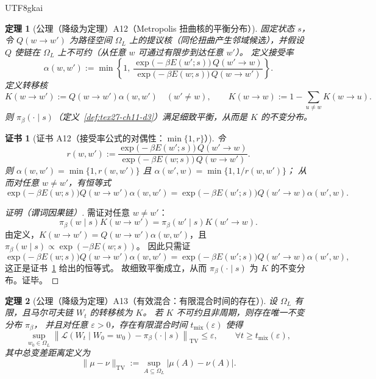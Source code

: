 \documentclass[12pt]{article}
\newtheorem{theorem}{定理}[section]
\newtheorem{Certificate}{证书}[section]
\begin{document}
\begin{CJK*}{UTF8}{gkai}
\begin{theorem}[公理（降级为定理）A12（Metropolis 扭曲核的平衡分布）]
\label{thm:tex27-ch11-a12}
固定状态 $s$，令 $Q(w\to w')$ 为路径空间 $\Omega_L$ 上的提议核（同伦扭曲产生邻域候选），并假设 $Q$ 使链在 $\Omega_L$ 上不可约（从任意 $w$ 可通过有限步到达任意 $w'$）。
定义接受率
\[
  \alpha(w,w')
  :=\min\left\{
  1,\
  \frac{\exp\bigl(-\beta E(w';s)\bigr)\,Q(w'\to w)}{\exp\bigl(-\beta E(w;s)\bigr)\,Q(w\to w')}
  \right\}.
\]
定义转移核
\[
  K(w\to w')
  :=Q(w\to w')\alpha(w,w')\quad (w'\ne w),
  \qquad
  K(w\to w):=1-\sum_{u\ne w}K(w\to u).
\]
则 $\pi_\beta(\cdot\mid s)$（定义~\ref{def:tex27-ch11-d3}）满足细致平衡，从而是 $K$ 的不变分布。
\end{theorem}

\begin{Certificate}[证书 A12（接受率公式的对偶性：$\min\{1,r\}$）]
\label{cert:tex27-ch11-a12}
令
\[
  r(w,w')
  :=\frac{\exp\bigl(-\beta E(w';s)\bigr)\,Q(w'\to w)}{\exp\bigl(-\beta E(w;s)\bigr)\,Q(w\to w')}.
\]
则 $\alpha(w,w')=\min\{1,r(w,w')\}$ 且 $\alpha(w',w)=\min\{1,1/r(w,w')\}$；
从而对任意 $w\ne w'$，有恒等式
\[
  \exp\bigl(-\beta E(w;s)\bigr)Q(w\to w')\alpha(w,w')
  =
  \exp\bigl(-\beta E(w';s)\bigr)Q(w'\to w)\alpha(w',w).
\]
\end{Certificate}

\begin{proof}[证明（谓词因果链）]
需证对任意 $w\ne w'$：
\[
  \pi_\beta(w\mid s)K(w\to w')=\pi_\beta(w'\mid s)K(w'\to w).
\]
由定义，$K(w\to w')=Q(w\to w')\alpha(w,w')$，且 $\pi_\beta(w\mid s)\propto \exp(-\beta E(w;s))$。
因此只需证
\[
  \exp\bigl(-\beta E(w;s)\bigr)Q(w\to w')\alpha(w,w')
  =
  \exp\bigl(-\beta E(w';s)\bigr)Q(w'\to w)\alpha(w',w),
\]
这正是证书~\ref{cert:tex27-ch11-a12} 给出的恒等式。
故细致平衡成立，从而 $\pi_\beta(\cdot\mid s)$ 为 $K$ 的不变分布。证毕。
\end{proof}

\begin{theorem}[公理（降级为定理）A13（有效混合：有限混合时间的存在）]
\label{thm:tex27-ch11-a13}
设 $\Omega_L$ 有限，且马尔可夫链 $W_t$ 的转移核为 $K$。
若 $K$ 不可约且非周期，则存在唯一不变分布 $\pi_\beta$，
并且对任意 $\varepsilon>0$，存在有限混合时间 $t_{\mathrm{mix}}(\varepsilon)$ 使得
\[
  \sup_{w_0\in\Omega_L}
  \left\|
  \mathcal{L}(W_t\mid W_0=w_0)-\pi_\beta(\cdot\mid s)
  \right\|_{\mathrm{TV}}
  \le \varepsilon,
  \qquad
  \forall t\ge t_{\mathrm{mix}}(\varepsilon),
\]
其中总变差距离定义为
\[
  \|\mu-\nu\|_{\mathrm{TV}}:=\sup_{A\subseteq\Omega_L}|\mu(A)-\nu(A)|.
\]
\end{theorem}


\end{CJK*}
\end{document}
